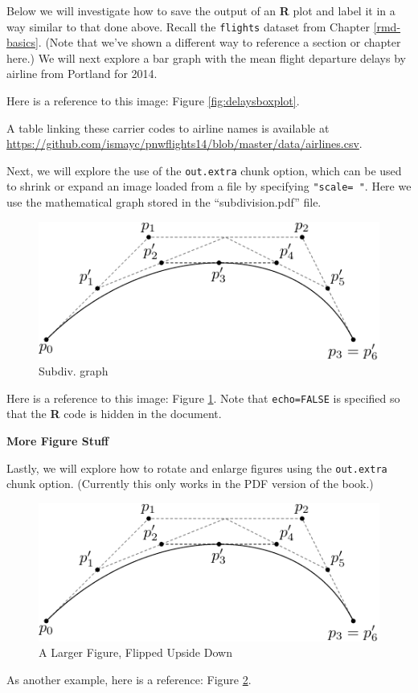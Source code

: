 \documentclass[12pt,twoside]{reedthesis}
\begin{document}
\clearpage

Below we will investigate how to save the output of an \textbf{R} plot and label it in a way similar to that done above. Recall the \texttt{flights} dataset from Chapter \ref{rmd-basics}. (Note that we've shown a different way to reference a section or chapter here.) We will next explore a bar graph with the mean flight departure delays by airline from Portland for 2014.

Here is a reference to this image: Figure \ref{fig:delaysboxplot}.

A table linking these carrier codes to airline names is available at \url{https://github.com/ismayc/pnwflights14/blob/master/data/airlines.csv}.

\clearpage

Next, we will explore the use of the \texttt{out.extra} chunk option, which can be used to shrink or expand an image loaded from a file by specifying \texttt{"scale=\ "}. Here we use the mathematical graph stored in the ``subdivision.pdf'' file.
\begin{figure}
\includegraphics[scale=0.75]{figure/subdivision} \caption{Subdiv. graph}\label{fig:subd}
\end{figure}
Here is a reference to this image: Figure \ref{fig:subd}. Note that \texttt{echo=FALSE} is specified so that the \textbf{R} code is hidden in the document.

\textbf{More Figure Stuff}

Lastly, we will explore how to rotate and enlarge figures using the \texttt{out.extra} chunk option. (Currently this only works in the PDF version of the book.)
\begin{figure}
\includegraphics[angle=180, scale=1.1]{figure/subdivision} \caption{A Larger Figure, Flipped Upside Down}\label{fig:subd2}
\end{figure}
As another example, here is a reference: Figure \ref{fig:subd2}.
\end{document}
